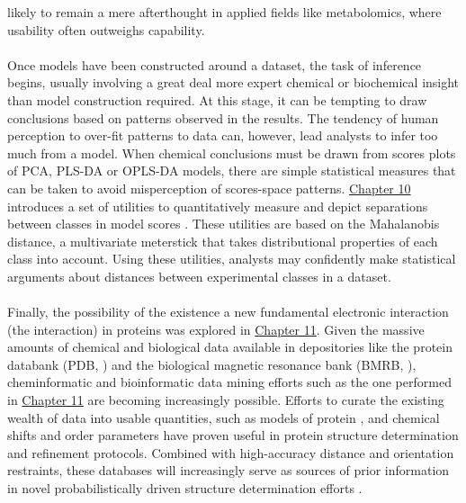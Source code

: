 \begin{doublespace}
likely to remain a mere afterthought in applied fields like metabolomics,
where usability often outweighs capability.
\\\\
Once models have been constructed around a dataset, the task of inference
begins, usually involving a great deal more expert chemical or biochemical
insight than model construction required. At this stage, it can be tempting
to draw conclusions based on patterns observed in the results. The tendency
of human perception to over-fit patterns to data can, however, lead analysts
to infer too much from a model. When chemical conclusions must be drawn from
scores plots of PCA, PLS-DA or OPLS-DA models, there are simple statistical
measures that can be taken to avoid misperception of scores-space patterns.
\hyperlink{chapter.10}{Chapter 10} introduces a set of utilities to
quantitatively measure and depict separations between classes in
model scores \cite{worley:abio2013}. These utilities are based on the
Mahalanobis distance, a multivariate meterstick \cite{demaesschalck:cils2000}
that takes distributional properties of each class into account. Using these
utilities, analysts may confidently make statistical arguments about distances
between experimental classes in a dataset.
\\\\
Finally, the possibility of the existence a new fundamental electronic
interaction (the \npistar{} interaction) in proteins was explored in
\hyperlink{chapter.11}{Chapter 11}. Given the massive amounts of chemical
and biological data available in depositories like the protein databank
(PDB, \cite{berman:nar2000}) and the biological magnetic resonance bank
(BMRB, \cite{ulrich:nar2008}), cheminformatic and bioinformatic data mining
efforts such as the one performed in \hyperlink{chapter.11}{Chapter 11} are
becoming increasingly possible. Efforts to curate the existing wealth of data
into usable quantities, such as models of protein \hnmr{}, \cnmr{} and \nnmr{}
chemical shifts \cite{osapay:jacs1991,spera:jacs1991,iwadate:jbnmr1999,
  han:jbnmr2011,li:jmr2015} and order parameters
\cite{berjanskii:jacs2005,berjanskii:jbnmr2008} have proven useful in
protein structure determination and refinement protocols. Combined with
high-accuracy distance \cite{vogeli:pnmrs2014} and orientation
\cite{li:cpc2015} restraints, these databases will increasingly serve
as sources of prior information in novel probabilistically driven structure
determination efforts \cite{nilges:struct2009,olsson:jctc2014}.
\\\\

\end{doublespace}
